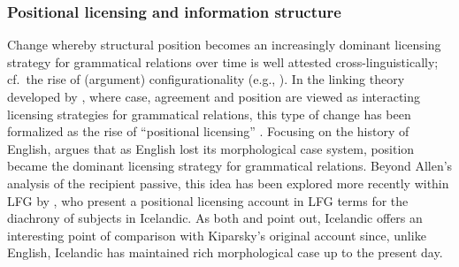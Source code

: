 \documentclass[output=paper,hidelinks]{langscibook}
\begin{document}



\subsubsection{Positional licensing and information structure}
\label{sec:Historical:positional}

Change whereby structural position becomes an increasingly dominant licensing strategy for grammatical relations over time is well attested cross-linguistically; cf.~the rise of (argument) configurationality (e.g., \citealp{hewson2006case,luraghi2010configurationality}). In the linking theory developed by \citet{kips87,Kiparsky1988,kips97,kips01}, where case, agreement and position are viewed as interacting licensing strategies for grammatical relations, this type of change has been formalized as the rise of ``positional licensing'' \citep{kips97}. Focusing on the history of English, \citet{kips97} argues that as English lost its morphological case system, position became the dominant licensing strategy for grammatical relations. Beyond Allen's analysis of the recipient passive,  this idea has been explored more recently within LFG by \citet{Booth17}, who present a positional licensing account in LFG terms for the diachrony of subjects in Icelandic.  As both \citet{kips97} and \citet{Booth17} point out,  Icelandic offers an interesting point of comparison with Kiparsky's original account since, unlike English, Icelandic has maintained rich morphological case up to the present day.
\end{document}
